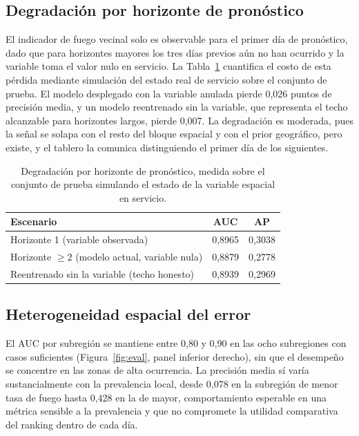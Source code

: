 \documentclass[11pt,a4paper]{article}
\begin{document}
\subsection{Degradación por horizonte de pronóstico}
\label{sec:horizonte}

El indicador de fuego vecinal solo es observable para el primer día de
pronóstico, dado que para horizontes mayores los tres días previos aún no
han ocurrido y la variable toma el valor nulo en servicio. La
Tabla~\ref{tab:horizonte} cuantifica el costo de esta pérdida mediante
simulación del estado real de servicio sobre el conjunto de prueba. El
modelo desplegado con la variable anulada pierde 0,026 puntos de precisión
media, y un modelo reentrenado sin la variable, que representa el techo
alcanzable para horizontes largos, pierde 0,007. La degradación es
moderada, pues la señal se solapa con el resto del bloque espacial y con el
prior geográfico, pero existe, y el tablero la comunica distinguiendo el
primer día de los siguientes.

\begin{table}[H]
\centering\small
\begin{tabular}{@{}lcc@{}}
\toprule
\textbf{Escenario} & \textbf{AUC} & \textbf{AP} \\
\midrule
Horizonte 1 (variable observada) & 0,8965 & 0,3038 \\
Horizonte $\geq 2$ (modelo actual, variable nula) & 0,8879 & 0,2778 \\
Reentrenado sin la variable (techo honesto) & 0,8939 & 0,2969 \\
\bottomrule
\end{tabular}
\caption{Degradación por horizonte de pronóstico, medida sobre el conjunto
de prueba simulando el estado de la variable espacial en servicio.}
\label{tab:horizonte}
\end{table}

\subsection{Heterogeneidad espacial del error}

El AUC por subregión se mantiene entre 0,80 y 0,90 en las ocho subregiones
con casos suficientes (Figura~\ref{fig:eval}, panel inferior derecho), sin
que el desempeño se concentre en las zonas de alta ocurrencia. La precisión
media sí varía sustancialmente con la prevalencia local, desde 0,078 en la
subregión de menor tasa de fuego hasta 0,428 en la de mayor, comportamiento
esperable en una métrica sensible a la prevalencia y que no compromete la
utilidad comparativa del ranking dentro de cada día.
\end{document}
